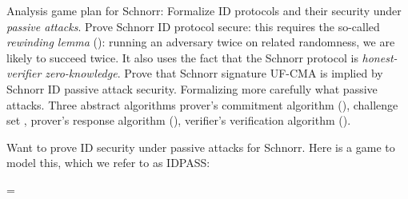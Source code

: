 Analysis game plan for Schnorr:
Formalize ID protocols and their security under \emph{passive attacks}. Prove Schnorr ID protocol secure: this requires the so-called \emph{rewinding lemma} (): running an adversary twice on related randomness, we are likely to succeed twice. It also uses the fact that the Schnorr protocol is \emph{honest-verifier zero-knowledge}.
Prove that Schnorr signature UF-CMA is implied by Schnorr ID passive attack security. Formalizing more carefully what passive attacks. Three abstract algorithms prover's commitment algorithm (\IDcom), challenge set \IDchalset, prover's response algorithm (\IDresp), verifier's verification algorithm (\IDver).


Want to prove ID security under passive attacks for Schnorr. Here is a game to model this, which we refer to as IDPASS:

\bnm
{} = 
\enm

\\

